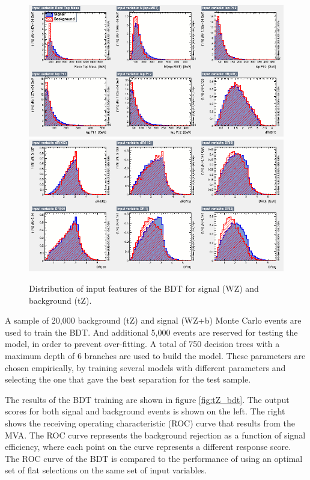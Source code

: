 \documentclass[NOTE, atlasdraft=true, texlive=2016, UKenglish]{\ATLASLATEXPATH atlasdoc}
\begin{document}
\begin{figure}[H]
\center
    \includegraphics[width=0.9\linewidth]{tZ_bdt/variables_id_c1.png}\\
    \includegraphics[width=0.9\linewidth]{tZ_bdt/variables_id_c2.png}\\
    \caption{Distribution of input features of the BDT for signal (WZ) and background (tZ).}
    \label{fig:tZ_kinematics}
\end{figure}

A sample of 20,000 background (tZ) and signal (WZ+b) Monte Carlo events are used to train the BDT. And additional 5,000 events are reserved for testing the model, in order to prevent over-fitting. A total of 750 decision trees with a maximum depth of 6 branches are used to build the model. These parameters are chosen empirically, by training several models with different parameters and selecting the one that gave the best separation for the test sample. 

The results of the BDT training are shown in figure \ref{fig:tZ_bdt}. The output scores for both signal and background events is shown on the left. The right shows the receiving operating characteristic (ROC) curve that results from the MVA. The ROC curve represents the background rejection as a function of signal efficiency, where each point on the curve represents a different response score. The ROC curve of the BDT is compared to the performance of using an optimal set of flat selections on the same set of input variables.
\end{document}
